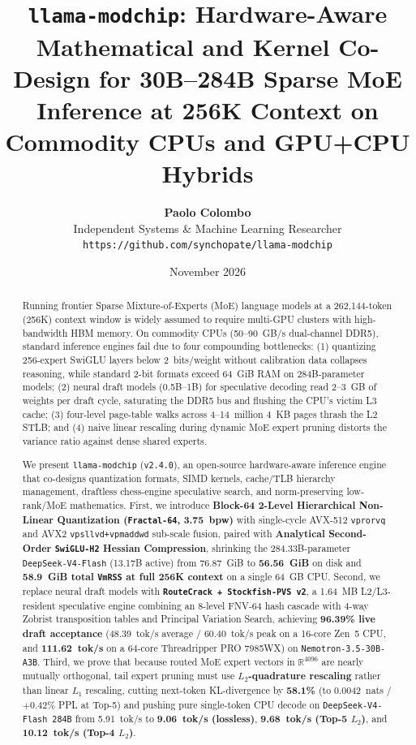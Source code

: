 \documentclass[10pt,twocolumn]{article}
\title{\textbf{\Large \texttt{llama-modchip}: Hardware-Aware Mathematical and Kernel Co-Design for 30B--284B Sparse MoE Inference at 256K Context on Commodity CPUs and GPU+CPU Hybrids}}
\author{
  \textbf{Paolo Colombo} \\
  Independent Systems \& Machine Learning Researcher \\
  \texttt{https://github.com/synchopate/llama-modchip}
}
\date{November 2026}
\begin{document}
\maketitle

\begin{abstract}
Running frontier Sparse Mixture-of-Experts (MoE) language models at a 262,144-token (256K) context window is widely assumed to require multi-GPU clusters with high-bandwidth HBM memory. On commodity CPUs (50--90~GB/s dual-channel DDR5), standard inference engines fail due to four compounding bottlenecks: (1) quantizing 256-expert SwiGLU layers below 2~bits/weight without calibration data collapses reasoning, while standard 2-bit formats exceed 64~GiB RAM on 284B-parameter models; (2) neural draft models (0.5B--1B) for speculative decoding read 2--3~GB of weights per draft cycle, saturating the DDR5 bus and flushing the CPU's victim L3 cache; (3) four-level page-table walks across 4--14~million 4~KB pages thrash the L2 STLB; and (4) naive linear rescaling during dynamic MoE expert pruning distorts the variance ratio against dense shared experts.

We present \texttt{llama-modchip} (\texttt{v2.4.0}), an open-source hardware-aware inference engine that co-designs quantization formats, SIMD kernels, cache/TLB hierarchy management, draftless chess-engine speculative search, and norm-preserving low-rank/MoE mathematics. First, we introduce \textbf{Block-64 2-Level Hierarchical Non-Linear Quantization (\texttt{Fractal-64}, 3.75~bpw)} with single-cycle AVX-512 \texttt{vprorvq} and AVX2 \texttt{vpsllvd+vpmaddwd} sub-scale fusion, paired with \textbf{Analytical Second-Order \texttt{SwiGLU-H2} Hessian Compression}, shrinking the 284.33B-parameter \texttt{DeepSeek-V4-Flash} (13.17B active) from 76.87~GiB to \textbf{56.56~GiB} on disk and \textbf{58.9~GiB total \texttt{VmRSS} at full 256K context} on a single 64~GB CPU. Second, we replace neural draft models with \textbf{\texttt{RouteCrack + Stockfish-PVS v2}}, a 1.64~MB L2/L3-resident speculative engine combining an 8-level FNV-64 hash cascade with 4-way Zobrist transposition tables and Principal Variation Search, achieving \textbf{96.39\% live draft acceptance} (48.39~tok/s average / 60.40~tok/s peak on a 16-core Zen~5 CPU, and \textbf{111.62~tok/s} on a 64-core Threadripper PRO 7985WX) on \texttt{Nemotron-3.5-30B-A3B}. Third, we prove that because routed MoE expert vectors in $\mathbb{R}^{4096}$ are nearly mutually orthogonal, tail expert pruning must use \textbf{$L_2$-quadrature rescaling} rather than linear $L_1$ rescaling, cutting next-token KL-divergence by \textbf{58.1\%} (to 0.0042~nats / $+0.42\%$ PPL at Top-5) and pushing pure single-token CPU decode on \texttt{DeepSeek-V4-Flash 284B} from 5.91~tok/s to \textbf{9.06~tok/s (lossless)}, \textbf{9.68~tok/s (Top-5 $L_2$)}, and \textbf{10.12~tok/s (Top-4 $L_2$)}.
\end{abstract}
\end{document}
